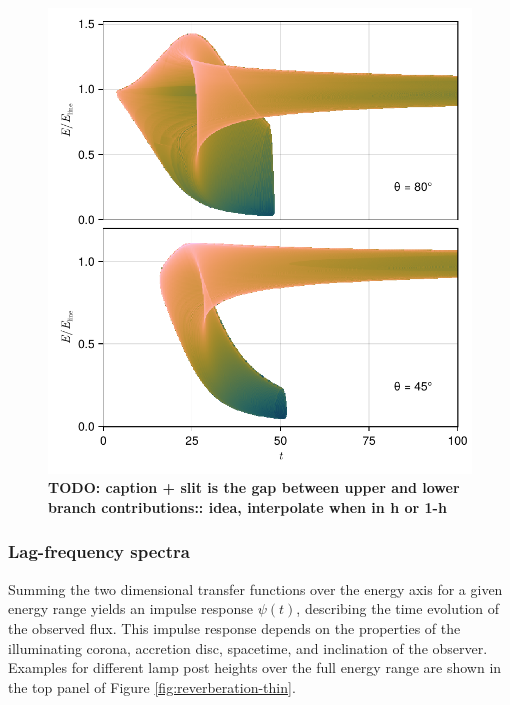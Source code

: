 \documentclass[fleqn,usenatbib]{mnras}
\newcommand{\todo}[1]{{\noindent \bf \color{red} TODO: #1}}
\begin{document}
\begin{figure}
	\centering
	\includegraphics[width=0.97\linewidth]{figures/transfer-functions.2d.pdf}
	\caption{\todo{caption + slit is the gap between upper and lower branch contributions:: idea, interpolate when in h or 1-h}}
	\label{fig:lag-frequency-transfer-functions}
\end{figure}

\subsubsection{Lag-frequency spectra}

Summing the two dimensional transfer functions over the energy axis for a given energy range yields an impulse response $\psi(t)$, describing the time evolution of the observed flux. This impulse response depends on the properties of the illuminating corona, accretion disc, spacetime, and inclination of the observer. Examples for different lamp post heights over the full energy range are shown in the top panel of Figure \ref{fig:reverberation-thin}.
\end{document}
